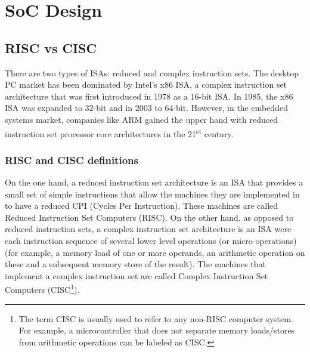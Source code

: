 
\chapter{SoC Design}
\label{chapter:socdesign}

\section{RISC vs CISC}
\label{section:riscvisa}

There are two types of ISAs: reduced and complex instruction sets. The desktop
PC market has been dominated by Intel's x86 ISA, a complex instruction set
architecture that was first introduced in 1978 as a 16-bit ISA. In 1985, the x86
ISA was expanded to 32-bit and in 2003 to 64-bit. However, in the embedded
systems market, companies like ARM gained the upper hand with reduced
instruction set processor core architectures in the 21\textsuperscript{st}
century.

\subsection{RISC and CISC definitions}
\label{subsection:risccisc definitions}

On the one hand, a reduced instruction set architecture is an ISA that provides
a small set of simple instructions that allow the machines they are implemented
in to have a reduced CPI (Cycles Per Instruction). These machines are called
Reduced Instruction Set Computers (RISC). On the other hand, as opposed to
reduced instruction sets, a complex instruction set architecture is an ISA were
each instruction sequence of several lower level operations (or
micro-operations) (for example, a memory load of one or more operands, an
arithmetic operation on these and a subsequent memory store of the result). The
machines that implement a complex instruction set are called Complex Instruction
Set Computers (CISC\footnote{The term CISC is usually used to refer to any
  non-RISC computer system. For example, a microcontroller that does not
  separate memory loads/stores from arithmetic operations can be labeled as
  CISC.}).

